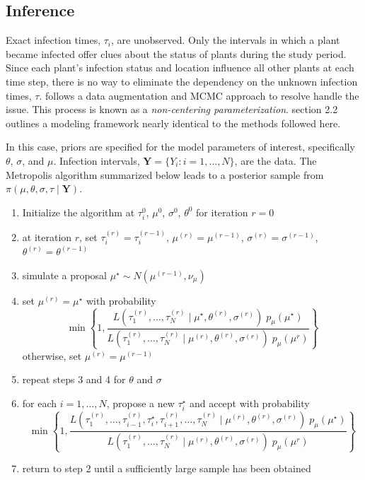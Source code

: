 \documentclass{uwstat572}
\begin{document}
\subsection{Inference}
Exact infection times, $\tau_i$, are unobserved. 
Only the intervals in which a plant became infected offer clues about the status of plants during the study period. 
Since each plant's infection status and location influence all other plants at each time step, there is no way to eliminate the dependency on the unknown infection times, $\tau$.
\citet{Brown} follows a data augmentation and MCMC approach to resolve handle the issue. 
This process is known as a \textit{non-centering parameterization}.
\citet{Jewell} section 2.2 outlines a modeling framework nearly identical to the methods followed here. 

In this case, priors are specified for the model parameters of interest, specifically $\theta$, $\sigma$, and $\mu$. 
Infection intervals, $\textbf{Y} = \{Y_i:i=1,\dots, N\}$, are the data. 
The Metropolis algorithm summarized below leads to a posterior sample from $\pi(\mu, \theta, \sigma, \tau \mid \textbf{Y})$. 

\begin{enumerate}
\item Initialize the algorithm at $\tau_i^{0}$, $\mu^{0}$, $\sigma^{0}$, $\theta^{0}$ for iteration $r=0$
\item at iteration $r$, set $\tau_i^{(r)}=\tau_i^{(r-1)}$, $\mu^{(r)}=\mu^{(r-1)}$, $\sigma^{(r)}=\sigma^{(r-1)}$, $\theta^{(r)}=\theta^{(r-1)}$
\item simulate a proposal $\mu^{\star} \sim N(\mu^{(r-1)}, \nu_{\mu})$
\item set $\mu^{(r)} = \mu^{\star}$ with probability
$$\min \left\{1, \frac{L( \tau^{(r)}_1, \dots, \tau^{(r)}_N \mid \mu^{\star}, \theta^{(r)}, \sigma^{(r)} ) \; p_{\mu}(\mu^{\star})}{L(\tau^{(r)}_1, \dots, \tau^{(r)}_N \mid \mu^{(r)}, \theta^{(r)}, \sigma^{(r)} ) \; p_{\mu}(\mu^{r})} \right\} $$
			otherwise, set $\mu^{(r)}=\mu^{(r-1)}$
\item repeat steps 3 and 4 for $\theta$ and $\sigma$
\item for each $i=1, \dots, N$, propose a new $\tau^{\star}_i$ and accept with probability
$$\min \left\{1, \frac{L( \tau^{(r)}_1, \dots, \tau^{(r)}_{i-1}, \tau^{\star}_i,\tau^{(r)}_{i+1}, \dots, \tau^{(r)}_N \mid \mu^{(r)}, \theta^{(r)}, \sigma^{(r)} ) \; p_{\mu}(\mu^{\star})}{L(\tau^{(r)}_1, \dots, \tau^{(r)}_N \mid \mu^{(r)}, \theta^{(r)}, \sigma^{(r)} ) \; p_{\mu}(\mu^{r})} \right\} $$
\item return to step 2 until a sufficiently large sample has been obtained
\end{enumerate}
\end{document}
